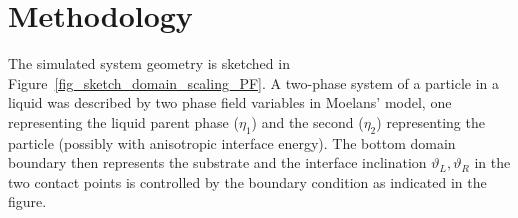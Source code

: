 \section{Methodology}
The simulated system geometry is sketched in Figure~\ref{fig_sketch_domain_scaling_PF}. A two-phase system of a particle in a liquid was described by two phase field variables in Moelans' model, one representing the liquid parent phase ($\eta_1$) and the second ($\eta_2$) representing the particle (possibly with anisotropic interface energy). The bottom domain boundary then represents the substrate and the interface inclination $\vartheta_L,\vartheta_R$ in the two contact points is controlled by the boundary condition as indicated in the figure.
